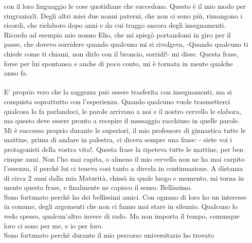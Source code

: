 con il loro linguaggio le cose quotidiane che succedono. Questo è il mio modo per ringraziarli.
Degli altri miei due nonni paterni, che non ci sono più, rimangono i ricordi, che rielaboro dopo anni e da cui traggo ancora degli insegnamenti.
Ricordo ad esempio mio nonno Elio, che mi spiegò portandomi in giro per il paese, che dovevo sorridere quando qualcuno mi si rivolgeva,
 -Quando qualcuno ti chiede come ti chiami, non dirlo con il broncio, sorridi!- mi disse.
 Questa frase, forse per lui spontanea e anche di poco conto, mi è tornata in mente qualche anno fa.
\\\\
 E' proprio vero che la saggezza può essere trasferita con insegnamenti, ma si conquista soprattutto con l'esperienza.
 Quando qualcuno vuole trasmetterci qualcosa lo fa parlandoci, 
 le parole arrivano a noi e il nostro cervello le elabora, ma questo deve essere pronto a recepire il messaggio racchiuso in quelle parole.
 Mi è successo proprio durante le superiori, il mio professore di ginnastica tutte le mattine, prima di andare in palestra, ci diceva sempre una frase: 
 - siete voi i protagonisti della vostra vita!. Questa frase la ripeteva tutte le mattine, per ben cinque anni. 
 Non l'ho mai capita, o almeno il mio cervello non ne ha mai carpito l'essenza, il perchè lui ci teneva cosi tanto a dircela in continuazione.
 A distanza di circa 2 anni dalla mia Maturità, chissà in quale luogo e momento, mi torna in mente questa frase, e finalmente ne capisco il senso. Bellissimo.
\\
Sono fortunato perchè ho dei bellissimi amici. Con ognuno di loro ho un interesse in comune, degli argomenti che non ci fanno mai stare in silenzio.
Qualcuno lo vedo spesso, qualcun'altro invece di rado. Ma non importa il tempo, comunque loro ci sono per me, e io per loro.
\\
Sono fortunato perchè durante il mio percorso universitario ho trovato
